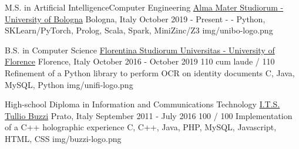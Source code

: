 
\begin{cventries}

  \logocventry
    {M.S. in Artificial Intelligence{\enskip\cdotp\enskip}Computer Engineering}
    {\href{https://www.unibo.it/en/homepage}{Alma Mater Studiorum - University of Bologna}}
    {Bologna, Italy}
    {October 2019 - Present}
    {
      \cvedu
        {-}
        {-}
        {Python, SKLearn/PyTorch, Prolog, Scala, Spark, MiniZinc/Z3}
    }
    {img/unibo-logo.png}

  \logocventry
    {B.S. in Computer Science}
    {\href{https://www.unifi.it/}{Florentina Studiorum Universitas - University of Florence}}
    {Florence, Italy}
    {October 2016 - October 2019}
    {
      \cvedu
        {110 cum laude / 110}
        {Refinement of a Python library to perform OCR on identity documents}
        {C, Java, MySQL, Python}
    }
    {img/unifi-logo.png}

  \logocventry
    {High-school Diploma in Information and Communications Technology}
    {\href{https://www.tulliobuzzi.edu.it/}{I.T.S. Tullio Buzzi}}
    {Prato, Italy}
    {September 2011 - July 2016}
    {
      \cvedu
        {100 / 100}
        {Implementation of a C++ holographic experience}
        {C, C++, Java, PHP, MySQL, Javascript, HTML, CSS}
    }
    {img/buzzi-logo.png}

\end{cventries}
